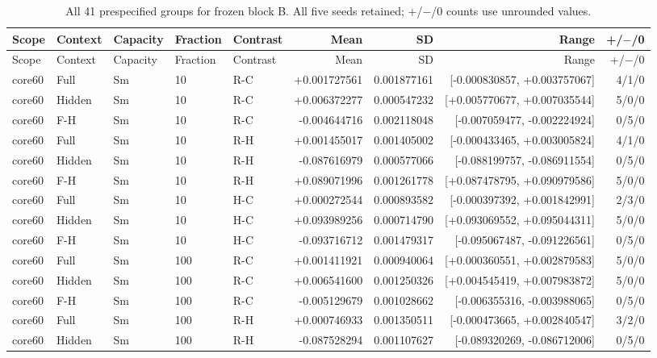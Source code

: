 \begingroup\scriptsize
\setlength{\tabcolsep}{3pt}
\begin{longtable}{lllllrrrr}
\caption{All 41 prespecified groups for frozen block B. All five seeds retained; +/$-$/0 counts use unrounded values.}\label{tab:confirmation-b-complete}\\
\toprule
Scope & Context & Capacity & Fraction & Contrast & Mean & SD & Range & +/$-$/0 \\
\midrule\endfirsthead
\toprule
Scope & Context & Capacity & Fraction & Contrast & Mean & SD & Range & +/$-$/0 \\
\midrule\endhead
\bottomrule\endfoot
core60 & Full & Sm & 10 & R-C & +0.001727561 & 0.001877161 & [-0.000830857, +0.003757067] & 4/1/0 \\
core60 & Hidden & Sm & 10 & R-C & +0.006372277 & 0.000547232 & [+0.005770677, +0.007035544] & 5/0/0 \\
core60 & F-H & Sm & 10 & R-C & -0.004644716 & 0.002118048 & [-0.007059477, -0.002224924] & 0/5/0 \\
core60 & Full & Sm & 10 & R-H & +0.001455017 & 0.001405002 & [-0.000433465, +0.003005824] & 4/1/0 \\
core60 & Hidden & Sm & 10 & R-H & -0.087616979 & 0.000577066 & [-0.088199757, -0.086911554] & 0/5/0 \\
core60 & F-H & Sm & 10 & R-H & +0.089071996 & 0.001261778 & [+0.087478795, +0.090979586] & 5/0/0 \\
core60 & Full & Sm & 10 & H-C & +0.000272544 & 0.000893582 & [-0.000397392, +0.001842991] & 2/3/0 \\
core60 & Hidden & Sm & 10 & H-C & +0.093989256 & 0.000714790 & [+0.093069552, +0.095044311] & 5/0/0 \\
core60 & F-H & Sm & 10 & H-C & -0.093716712 & 0.001479317 & [-0.095067487, -0.091226561] & 0/5/0 \\
core60 & Full & Sm & 100 & R-C & +0.001411921 & 0.000940064 & [+0.000360551, +0.002879583] & 5/0/0 \\
core60 & Hidden & Sm & 100 & R-C & +0.006541600 & 0.001250326 & [+0.004545419, +0.007983872] & 5/0/0 \\
core60 & F-H & Sm & 100 & R-C & -0.005129679 & 0.001028662 & [-0.006355316, -0.003988065] & 0/5/0 \\
core60 & Full & Sm & 100 & R-H & +0.000746933 & 0.001350511 & [-0.000473665, +0.002840547] & 3/2/0 \\
core60 & Hidden & Sm & 100 & R-H & -0.087528294 & 0.001107627 & [-0.089320269, -0.086712006] & 0/5/0 \\

\end{longtable}
